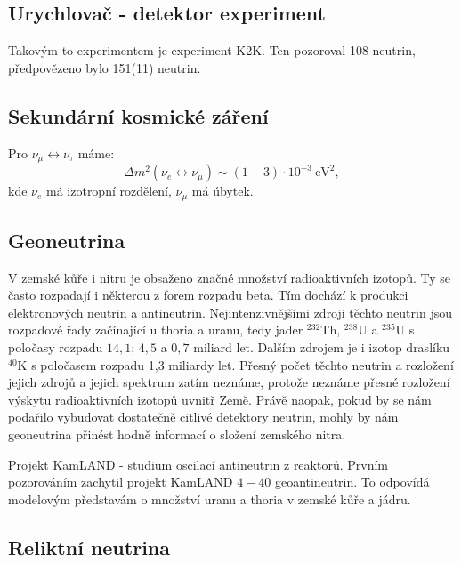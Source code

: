 \documentclass[../../main.tex]{subfiles}
\begin{document}
\subsection{Urychlovač - detektor experiment}

Takovým to experimentem je experiment K2K. Ten pozoroval 108 neutrin, předpovězeno bylo 151(11) neutrin. 

\subsection{Sekundární kosmické záření}

Pro $\nu_{\mu} \leftrightarrow \nu_{\tau}$ máme:
\begin{equation}
\Delta m^2 (\nu_e \leftrightarrow \nu_{\mu}) \sim (1-3) \cdotp 10^{-3} ~\mathrm{eV^2},
\end{equation}
kde $\nu_e$ má izotropní rozdělení, $\nu_{\mu}$ má úbytek.


\subsection{Geoneutrina}

V zemské kůře i nitru je obsaženo značné množství radioaktivních izotopů. Ty se často rozpadají i některou z forem rozpadu beta. Tím dochází k produkci elektronových neutrin a antineutrin. Nejintenzivnějšími zdroji těchto neutrin jsou rozpadové řady začínající u thoria a uranu, tedy jader $^{232}$Th, $^{238}$U a $^{235}$U s poločasy rozpadu $14,1$; $4,5$ a $0,7$ miliard let. Dalším zdrojem je i izotop draslíku $^{40}$K s poločasem rozpadu 1,3 miliardy let. Přesný počet těchto neutrin a rozložení jejich zdrojů a jejich spektrum zatím neznáme, protože neznáme přesné rozložení výskytu radioaktivních izotopů uvnitř Země. Právě naopak, pokud by se nám podařilo vybudovat dostatečně citlivé detektory neutrin, mohly by nám geoneutrina přinést hodně informací o složení zemského nitra.

Projekt KamLAND - studium oscilací antineutrin z reaktorů. Prvním pozorováním zachytil projekt KamLAND $4-40$ geoantineutrin. To odpovídá modelovým představám o množství uranu a thoria v zemské kůře a jádru. 

\subsection{Reliktní neutrina}
\end{document}
